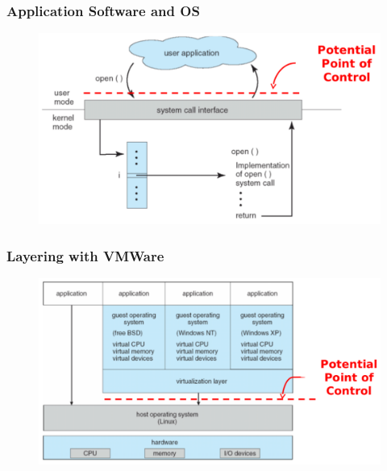 \documentclass[t,handout]{beamer}
\begin{document}
\begin{frame}
\frametitle{Application Software and OS}
\begin{figure}[!t]
\centering
\includegraphics[width=\textwidth]{9-crop}
\end{figure}
\end{frame}

\begin{frame}
\frametitle{Layering with VMWare}
\begin{figure}[!t]
\centering
\includegraphics[width=\textwidth]{10-crop}
\end{figure}
\end{frame}
\end{document}

